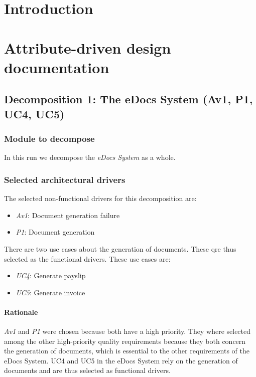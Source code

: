 \documentclass[a4paper,10pt]{article}
\begin{document}


\tableofcontents
\newpage

\section{Introduction}\label{sec:introduction}

\section{Attribute-driven design documentation}\label{sec:add}
\subsection{Decomposition 1: The eDocs System (Av1, P1, UC4, UC5)}
\subsubsection{Module to decompose}
In this run we decompose the \emph{eDocs System} as a whole.

\subsubsection{Selected architectural drivers}
The selected non-functional drivers for this decomposition are:

\begin{itemize}
    \item \emph{Av1}: Document generation failure
    \item \emph{P1}: Document generation
\end{itemize}

There are two use cases about the generation of documents. These qre thus selected as the functional drivers. These use cases are:

\begin{itemize}
    \item \emph{UC4}: Generate payslip
    \item \emph{UC5}: Generate invoice
\end{itemize}

\paragraph{Rationale}
\emph{Av1} and \emph{P1} were chosen because both have a high priority. They where selected among the other high-priority quality requirements because they both concern the generation of documents, which is essential to the other requirements of the eDocs System.
UC4 and UC5 in the eDocs System rely on the generation of documents and are thus selected as functional drivers.
\end{document}
